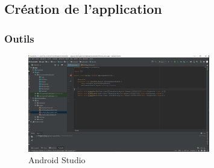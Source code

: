 \documentclass{beamer}
\begin{document}
\begin{frame}

\subsection{Création de l'application}
\frametitle{Outils}
\begin{figure}
        \centering
        \includegraphics[width=300]{img/andro.png}
        \caption{Android Studio}
        \label{fig:my_label}
    \end{figure}

 
\end{frame}
\end{document}

